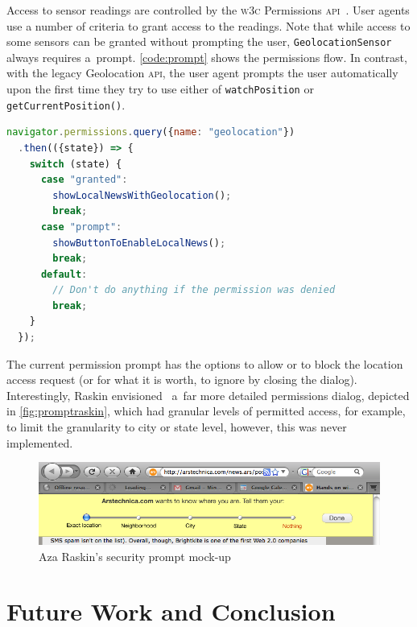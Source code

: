 \documentclass[sigconf,hyphens]{acmart}
\begin{document}
Access to sensor readings are controlled by the \textsc{w3c} Permissions
\textsc{api}~\cite{lamouri2017permissions}.
User agents use a number of criteria to grant access to the readings.
Note that while access to some sensors can be granted without prompting the user,
\texttt{GeolocationSensor} always requires a~prompt.
\autoref{code:prompt} shows the permissions flow.
In contrast, with the legacy Geolocation \textsc{api}, the user agent prompts the user automatically
upon the first time they try to use either of \texttt{watchPosition} or \texttt{getCurrentPosition()}.

\begin{lstlisting}[caption={Asking for permission to use \texttt{GeolocationSensor}},
  label=code:prompt, language=JavaScript, float=h] 
navigator.permissions.query({name: "geolocation"})
  .then(({state}) => {
    switch (state) {
      case "granted":
        showLocalNewsWithGeolocation();
        break;
      case "prompt":
        showButtonToEnableLocalNews();
        break;
      default:
        // Don't do anything if the permission was denied
        break;
    }
  });
\end{lstlisting}

The current permission prompt has the options to allow or to block
the location access request (or for what it is worth, to ignore by closing the dialog).
Interestingly, Raskin envisioned~\cite{raskin2010geolocation} a~far more detailed permissions
dialog, depicted in \autoref{fig:promptraskin}, which had granular levels of permitted access,
for example, to limit the granularity to city or state level,
however, this was never implemented.

\begin{figure}[h]
  \includegraphics[width=\columnwidth]{mockup-prompt.png}
  \caption{Aza Raskin's security prompt mock-up~\cite{raskin2010geolocation}}
  \label{fig:promptraskin}
\end{figure}

\section{Future Work and Conclusion}
\end{document}
